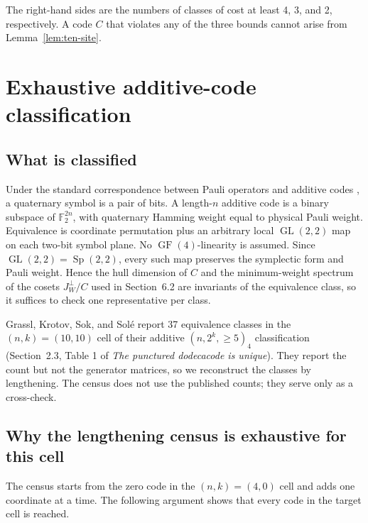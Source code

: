\documentclass[11pt]{article}
\begin{document}
The right-hand sides are the numbers of classes of cost at least 4, 3, and 2, respectively. A code \(C\) that violates any of the three bounds cannot arise from Lemma~\ref{lem:ten-site}.

\section{Exhaustive additive-code classification}\label{exhaustive-additive-code-classification}

\subsection{What is classified}\label{what-is-classified}

Under the standard correspondence between Pauli operators and additive codes \cite{calderbank-shor-sloane}, a quaternary symbol is a pair of bits. A length-\(n\) additive code is a binary subspace of \(\mathbb{F}_{2}^{2n}\), with quaternary Hamming weight equal to physical Pauli weight. Equivalence is coordinate permutation plus an arbitrary local \(\operatorname{GL}(2,2)\) map on each two-bit symbol plane. No \(\operatorname{GF}(4)\)-linearity is assumed. Since \(\operatorname{GL}(2,2)=\operatorname{Sp}(2,2)\), every such map preserves the symplectic form and Pauli weight. Hence the hull dimension of \(C\) and the minimum-weight spectrum of the cosets \(J^\perp_W/C\) used in Section~6.2 are invariants of the equivalence class, so it suffices to check one representative per class.

Grassl, Krotov, Sok, and Solé \cite{grassl-et-al} report 37 equivalence classes in the \((n,k)=(10,10)\) cell of their additive \((n,2^{k}, \geq 5)_{4}\) classification (Section~2.3, Table 1 of \emph{The punctured dodecacode is unique}). They report the count but not the generator matrices, so we reconstruct the classes by lengthening. The census does not use the published counts; they serve only as a cross-check.

\subsection{Why the lengthening census is exhaustive for this cell}\label{why-the-lengthening-census-is-exhaustive-for-this-cell}

The census starts from the zero code in the \((n,k)=(4,0)\) cell and adds one coordinate at a time. The following argument shows that every code in the target cell is reached.
\end{document}
